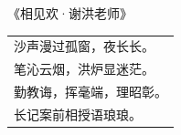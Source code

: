 \begin{acknowledgements}

\begin{center}
    {\heiti \large 《相见欢·谢洪老师》} \\[0.8em]
    \begin{tabular}{l}
        沙声漫过孤窗，夜长长。 \\
        笔沁云烟，洪炉显迷茫。 \\
        勤教诲，挥毫端，理昭彰。 \\
        长记案前相授语琅琅。
    \end{tabular}
\end{center}

\end{acknowledgements}
